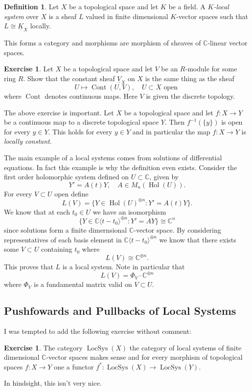 \documentclass[12pt]{book}
\numberwithin{equation}{section}
\theoremstyle{definition}
\newtheorem{definition}[theorem]{Definition}
\newtheorem{exercise}[theorem]{Exercise}
\theoremstyle{remark}
\newcommand{\CC}{\mathbb{C}}
\newcommand{\hol}{\operatorname{Hol}}
\newcommand{\LocSys}{\operatorname{LocSys}}
\newcommand{\Cont}{\operatorname{Cont}}
\begin{document}
\begin{definition}
	Let $X$ be a topological space and let $K$ be a field. 
	A \emph{$K$-local system} over $X$ is a sheaf $L$ valued in finite dimensional $K$-vector spaces such that $L \cong \underline{K}_X$ locally. 
\end{definition}
This forms a category and morphisms are morphism of sheaves of $\CC$-linear vector spaces. 

\begin{exercise}\label{EX:locally-constant}
	Let $X$ be a topological space and let $V$ be an $R$-module for some ring $R$. 
	Show that the constant sheaf $\underline{V}_X$ on $X$ is the same thing as the sheaf  $$U\mapsto\Cont(U,V), \quad U \subset X \mbox{ open }$$ 
	where $\Cont$ denotes continuous maps.
	Here $V$ is given the discrete topology. 
\end{exercise}
The above exercise is important. 
Let $X$ be a topological space and let $f:X\to Y$ be a continuous map to a discrete topological space $Y$.
Then $f^{-1}(\lbrace y\rbrace)$ is open for every $y \in Y$. 
This holds for every $y\in Y$ and in particular the map $f:X\to Y$ is \emph{locally constant}. 

The main example of a local systems comes from solutions of differential equations. 
In fact this example is why the definition even exists. 
Consider the first order holomorphic system defined on $U \subset \CC$, given by 
$$ Y' = A(t) Y, \quad A \in M_n(\hol(U)).$$
For every $V \subset U$ open define  
$$ L(V) = \lbrace Y \in \hol(U)^{\oplus n} \colon Y' = A(t) Y \rbrace.$$
We know that at each $t_0 \in U$ we have an isomorphism 
$$ \lbrace Y \in \CC\langle t-t_0 \rangle^{\oplus n} \colon Y'=AY \rbrace \cong \CC^n $$
since solutions form a finite dimernsional $\CC$-vector space. 
By considering representatives of each basis element in $\CC\langle t-t_0 \rangle^{\oplus n}$ we know that there exists some $V \subset U$ containing $t_0$ where 
$$ L(V) \cong \CC^{\oplus n}.$$
This proves that $L$ is a local system. Note in particular that 
$$ L(V) = \Phi_V \cdot \CC^{\oplus n } $$
where $\Phi_V$ is a fundamental matrix valid on $V \subset U$. 

\subsection{Pushfowards and Pullbacks of Local Systems}
I was tempted to add the following exercise without comment:
\begin{exercise}
	The category $\LocSys(X)$ the category of local systems of finite dimensional $\CC$-vector spaces makes sense and for every morphism of topological spaces $f:X\to Y$ one a functor $f^*:\LocSys(X) \to \LocSys(Y)$.
\end{exercise}
In hindsight, this isn't very nice. 
\end{document}
